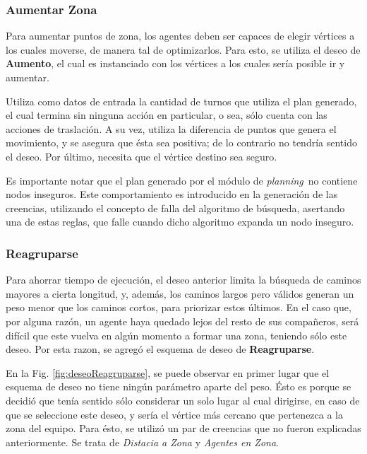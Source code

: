 \documentclass[oneside]{book}
\theoremstyle{definition}
\theoremstyle{example}
\begin{document}
\subsubsection{Aumentar Zona}

Para aumentar puntos de zona, los agentes deben ser capaces de elegir vértices a los 
cuales moverse, de manera tal de optimizarlos. Para esto, se utiliza el deseo de 
\textbf{Aumento}, el cual es instanciado con los vértices a los cuales sería posible ir y 
aumentar. 

Utiliza como datos de entrada la cantidad de turnos que utiliza el plan generado, el 
cual termina sin ninguna acción en particular, o sea, sólo cuenta con las acciones 
de traslación. A su vez, utiliza la diferencia de puntos que genera el movimiento, y 
se asegura que ésta sea positiva; de lo contrario no tendría sentido el deseo. Por 
último, necesita que el vértice destino sea seguro.

Es importante notar que el plan generado por el módulo de \textit{planning}\ no contiene
nodos inseguros. Este comportamiento es introducido en la generación de las creencias,
utilizando el concepto de falla del algoritmo de búsqueda, asertando una de estas reglas,
que falle cuando dicho algoritmo expanda un nodo inseguro.


\subsubsection{Reagruparse}

Para ahorrar tiempo de ejecución, el deseo anterior limita la búsqueda de caminos mayores
a cierta longitud, y, además, los caminos largos pero válidos generan un peso menor que 
los caminos cortos, para priorizar estos últimos. En el caso que, por alguna razón, un 
agente haya quedado lejos del resto de sus compañeros, será difícil que este vuelva en 
algún momento a formar una zona, teniendo sólo este deseo. Por esta razon, se agregó el
esquema de deseo de \textbf{Reagruparse}.

En la Fig. \ref{fig:deseoReagruparse}, se puede observar en primer lugar que el esquema 
de deseo no tiene ningún parámetro aparte del peso. Ésto es porque se decidió que tenía 
sentido sólo considerar un solo lugar al cual dirigirse, en caso de que se seleccione 
este deseo, y sería el vértice más cercano que pertenezca a la zona del equipo. Para 
ésto, se utilizó un par de creencias que no fueron explicadas anteriormente. Se trata de 
\textit{Distacia a Zona} y \textit{Agentes en Zona}.
\end{document}
